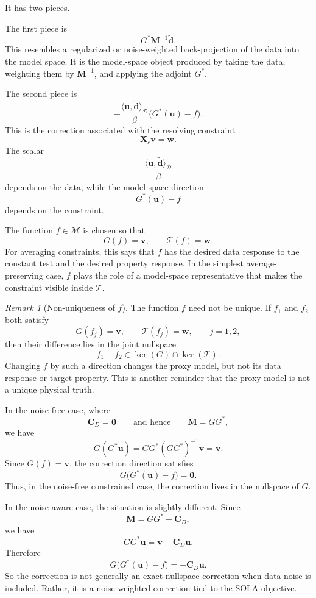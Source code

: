 \documentclass[11pt,openany]{book}
\theoremstyle{definition}
\theoremstyle{remark}
\newtheorem{remark}{Remark}[chapter]
\newcommand{\M}{\mathcal M}
\newcommand{\D}{\mathcal D}
\newcommand{\Tau}{\mathcal{T}}
\newcommand{\kernel}{\operatorname{ker}}
\begin{document}
It has two pieces.

The first piece is
\[
  G^*\mathbf M^{-1}\widetilde{\mathbf d}.
\]
This resembles a regularized or noise-weighted back-projection of the data into the model space.
It is the model-space object produced by taking the data, weighting them by
\(\mathbf M^{-1}\), and applying the adjoint \(G^*\).

The second piece is
\[
  -
  \frac{\langle \mathbf u,\widetilde{\mathbf d}\rangle_{\D}}{\beta}
  \bigl(G^*(\mathbf u)-f\bigr).
\]
This is the correction associated with the resolving constraint
\[
  \mathbf X_c\mathbf v=\mathbf w.
\]
The scalar
\[
  \frac{\langle \mathbf u,\widetilde{\mathbf d}\rangle_{\D}}{\beta}
\]
depends on the data, while the model-space direction
\[
  G^*(\mathbf u)-f
\]
depends on the constraint.

The function \(f\in\M\) is chosen so that
\[
  G(f)=\mathbf v,
  \qquad
  \Tau(f)=\mathbf w.
\]
For averaging constraints, this says that \(f\) has the desired data response to the constant
test and the desired property response. In the simplest average-preserving case, \(f\) plays the
role of a model-space representative that makes the constraint visible inside \(\Tau\).

\begin{remark}[Non-uniqueness of \(f\)]
The function \(f\) need not be unique. If \(f_1\) and \(f_2\) both satisfy
\[
  G(f_j)=\mathbf v,
  \qquad
  \Tau(f_j)=\mathbf w,
  \qquad j=1,2,
\]
then their difference lies in the joint nullspace
\[
  f_1-f_2\in\kernel(G)\cap\kernel(\Tau).
\]
Changing \(f\) by such a direction changes the proxy model, but not its data response or target
property. This is another reminder that the proxy model is not a unique physical truth.
\end{remark}

In the noise-free case, where
\[
  \mathbf C_D=\mathbf 0
  \qquad\text{and hence}\qquad
  \mathbf M=GG^*,
\]
we have
\[
  G(G^*\mathbf u)
  =
  GG^*(GG^*)^{-1}\mathbf v
  =
  \mathbf v.
\]
Since \(G(f)=\mathbf v\), the correction direction satisfies
\[
  G\bigl(G^*(\mathbf u)-f\bigr)=\mathbf 0.
\]
Thus, in the noise-free constrained case, the correction lives in the nullspace of \(G\).

In the noise-aware case, the situation is slightly different. Since
\[
  \mathbf M=GG^*+\mathbf C_D,
\]
we have
\[
  GG^*\mathbf u
  =
  \mathbf v-\mathbf C_D\mathbf u.
\]
Therefore
\[
  G\bigl(G^*(\mathbf u)-f\bigr)
  =
  -\mathbf C_D\mathbf u.
\]
So the correction is not generally an exact nullspace correction when data noise is included.
Rather, it is a noise-weighted correction tied to the SOLA objective.
\end{document}
